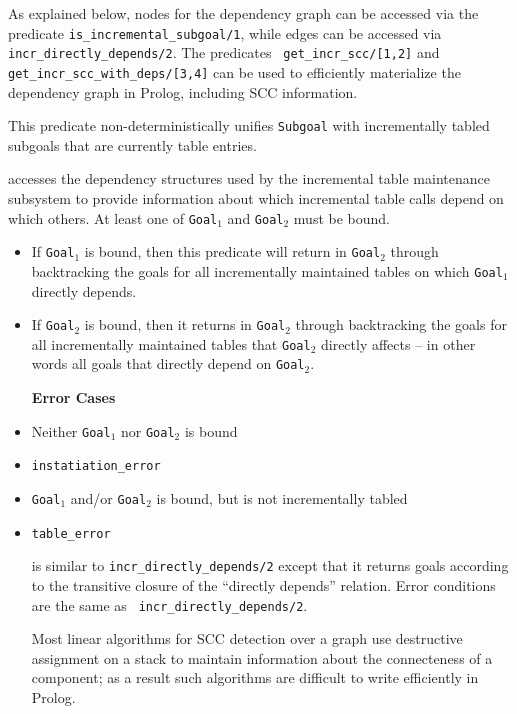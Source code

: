 As explained below, nodes for the dependency graph can be accessed via
the predicate {\tt is\_incremental\_subgoal/1}, while edges can be
accessed via {\tt incr\_directly\_depends/2}.  The predicates {\tt
  get\_incr\_scc/[1,2]} and {\tt get\_incr\_scc\_with\_deps/[3,4]} can
be used to efficiently materialize the dependency graph in Prolog,
including SCC information.

\begin{description}

%
This predicate non-deterministically unifies {\tt Subgoal} with
incrementally tabled subgoals that are currently table entries.

accesses the dependency structures used by the incremental table
maintenance subsystem to provide information about which incremental
table calls depend on which others.  At least one of {\tt Goal$_1$}
and {\tt Goal$_2$} must be bound.
\begin{itemize}
\item If {\tt Goal$_1$} is bound, then this predicate will return in
  {\tt Goal$_2$} through backtracking the goals for all incrementally
  maintained tables on which {\tt Goal$_1$} directly depends.
\item If {\tt Goal$_2$} is bound, then it returns in {\tt Goal$_2$}
  through backtracking the goals for all incrementally maintained
  tables that {\tt Goal$_2$} directly affects -- in other words all
  goals that directly depend on {\tt Goal$_2$}.  \ei

{\bf Error Cases}
\bi
\item Neither {\tt Goal$_1$} nor {\tt Goal$_2$} is bound 
\bi
\item 	{\tt instatiation\_error}
\ei
\item {\tt Goal$_1$} and/or {\tt Goal$_2$} is bound, but is not
  incrementally tabled
\bi
\item 	{\tt table\_error}
\ei
\ei

is similar to {\tt incr\_directly\_depends/2} except that it returns
goals according to the transitive closure of the ``directly depends''
relation.  Error conditions are the same as {\tt
  incr\_directly\_depends/2}.

%
Most linear algorithms for SCC detection over a graph use destructive
assignment on a stack to maintain information about the connecteness
of a component; as a result such algorithms are
difficult to write efficiently in Prolog.


\end{itemize}
\end{description}
